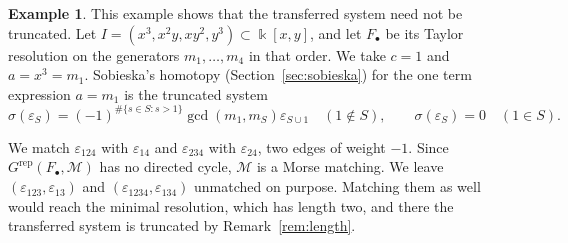 \documentclass[12pt]{amsart}
\theoremstyle{plain}
\theoremstyle{definition}
\newtheorem{example}[theorem]{Example}
\newcommand{\kk}{\Bbbk}
\newcommand{\F}{ {F_\bullet} }
\newcommand{\M}{\mathcal{M}}
\newcommand{\Grep}{G^{\mathrm{rep}}}
\newcommand{\eps}{\varepsilon}
\begin{document}
\begin{example}\label{ex:defect}
    This example shows that the transferred system need not be truncated. Let $I = (x^3, x^2y, xy^2, y^3) \subset \kk[x, y]$, and let $\F$ be its Taylor resolution on the generators $m_1, \dots, m_4$ in that order. We take $c = 1$ and $a = x^3 = m_1$. Sobieska's homotopy (Section~\ref{sec:sobieska}) for the one term expression $a = m_1$ is the truncated system
    \[
        \sigma(\eps_S) = (-1)^{\#\{s \in S : s > 1\}} \gcd(m_1, m_S) \eps_{S \cup 1} \quad (1 \notin S), \qquad \sigma(\eps_S) = 0 \quad (1 \in S).
    \]

    We match $\eps_{124}$ with $\eps_{14}$ and $\eps_{234}$ with $\eps_{24}$, two edges of weight $-1$. Since $\Grep(\F, \M)$ has no directed cycle, $\M$ is a Morse matching. We leave $(\eps_{123}, \eps_{13})$ and $(\eps_{1234}, \eps_{134})$ unmatched on purpose. Matching them as well would reach the minimal resolution, which has length two, and there the transferred system is truncated by Remark~\ref{rem:length}.


\end{example}
\end{document}
